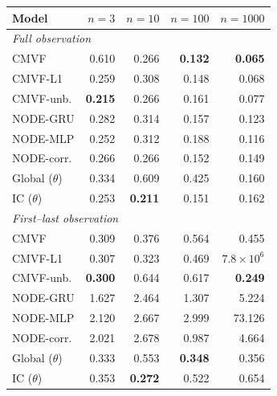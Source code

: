 \begin{tabular}{lrrrr}
\toprule
Model & $n{=}3$ & $n{=}10$ & $n{=}100$ & $n{=}1000$ \\
\midrule
\multicolumn{5}{l}{\emph{Full observation}} \\
CMVF & 0.610 & 0.266 & \textbf{0.132} & \textbf{0.065} \\
CMVF-L1 & 0.259 & 0.308 & 0.148 & 0.068 \\
CMVF-unb. & \textbf{0.215} & 0.266 & 0.161 & 0.077 \\
NODE-GRU & 0.282 & 0.314 & 0.157 & 0.123 \\
NODE-MLP & 0.252 & 0.312 & 0.188 & 0.116 \\
NODE-corr. & 0.266 & 0.266 & 0.152 & 0.149 \\
Global ($\theta$) & 0.334 & 0.609 & 0.425 & 0.160 \\
IC ($\theta$) & 0.253 & \textbf{0.211} & 0.151 & 0.162 \\
\midrule
\multicolumn{5}{l}{\emph{First--last observation}} \\
CMVF & 0.309 & 0.376 & 0.564 & 0.455 \\
CMVF-L1 & 0.307 & 0.323 & 0.469 & $7.8\!\times\!10^{6}$ \\
CMVF-unb. & \textbf{0.300} & 0.644 & 0.617 & \textbf{0.249} \\
NODE-GRU & 1.627 & 2.464 & 1.307 & 5.224 \\
NODE-MLP & 2.120 & 2.667 & 2.999 & 73.126 \\
NODE-corr. & 2.021 & 2.678 & 0.987 & 4.664 \\
Global ($\theta$) & 0.333 & 0.553 & \textbf{0.348} & 0.356 \\
IC ($\theta$) & 0.353 & \textbf{0.272} & 0.522 & 0.654 \\
\bottomrule
\end{tabular}
